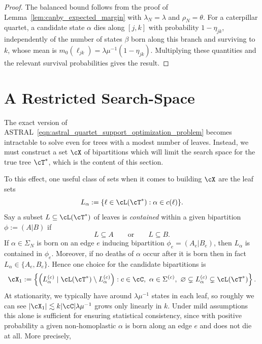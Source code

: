 \begin{proof}
The balanced bound follows from the proof of Lemma~\ref{lem:canby_expected_margin} with
$\lambda_N=\lambda$ and $\rho_N=\theta$. For a caterpillar quartet, a candidate state $\alpha$
dies along $[j,k]$ with probability $1-\eta_{jk}$, independently of the number of states $\beta$
born along this branch and surviving to $k$, whose mean is
$m_0(\ell_{jk})=\lambda\mu^{-1}(1-\eta_{jk})$. Multiplying these quantities and the relevant
survival probabilities gives the result.
\end{proof}

\section{A Restricted Search-Space}
\label{sec:bipartition_covers_canby}

\noindent The exact version of ASTRAL~\eqref{eqn:astral_quartet_support_optimization_problem}
becomes intractable to solve even for trees with a modest number of leaves. Instead, we must construct a
set $\cX$ of bipartitions which will limit the search space for the true tree $\cT^*$, which is the content of this section.

To this effect, one useful class of sets when it comes to building $\cX$ are the leaf sets
%
\[L_\alpha := \{\ell \in \cL(\cT^*) : \alpha \in c(\ell)\}.\]
%
\noindent Say a subset $L \subseteq \cL(\cT^*)$ of leaves is \textit{contained} within a given bipartition $\phi := (A|B)$ if
%
\[L \subseteq A \qquad \text{or} \qquad L \subseteq B.\]
%
 If $\alpha \in \Sigma_N$ is born
 on an edge $e$ inducing bipartition $\phi_e = (A_e | B_e)$, then $L_\alpha$ is contained in $\phi_e$. Moreover, if no
deaths of $\alpha$ occur after it is born then in fact $L_\alpha \in \{A_e, B_e\}$. Hence
one choice for the candidate bipartitions is
%
\[\cX_1 := \left\{\left(L^{(c)}_\alpha \mid \cL(\cT^*) \setminus L^{(c)}_\alpha\right) :
c \in \cC,\ \alpha \in \Sigma^{(c)},\ \varnothing \subsetneq L^{(c)}_\alpha \subsetneq \cL(\cT^*)\right\}.\]
%
\noindent At stationarity, we typically have around $\lambda \mu^{-1}$ states in each leaf,
so roughly we can see $|\cX_1| \lesssim k |\cC| \lambda \mu^{-1}$ grows only linearly in $k$.
Under mild assumptions this alone is sufficient for ensuring statistical consistency,
since with positive probability a given non-homoplastic $\alpha$ is born
along an edge $e$ and does not die at all. More precisely,

